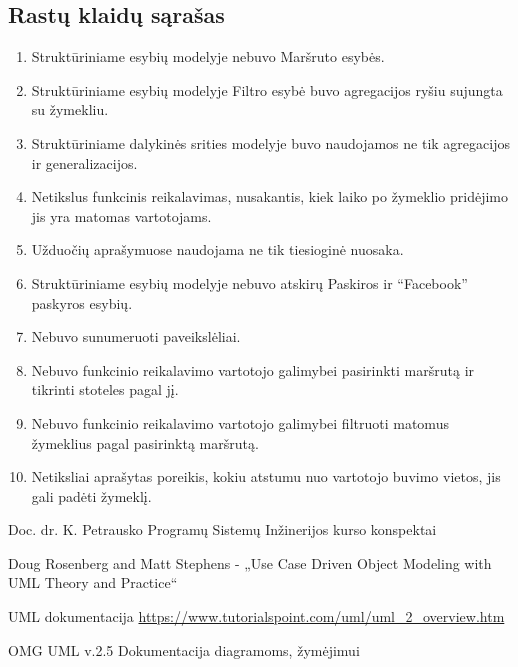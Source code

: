 \documentclass{VUMIFPSkursinis}
\begin{document}
\subsection{Rastų klaidų sąrašas}
	\begin{enumerate}[itemsep=-2mm]
		\item Struktūriniame esybių modelyje nebuvo Maršruto esybės.
		\item Struktūriniame esybių modelyje Filtro esybė buvo agregacijos ryšiu sujungta su žymekliu.
		\item Struktūriniame dalykinės srities modelyje buvo naudojamos ne tik agregacijos ir generalizacijos.
		\item Netikslus funkcinis reikalavimas, nusakantis, kiek laiko po žymeklio pridėjimo jis yra matomas vartotojams.
		\item Užduočių aprašymuose naudojama ne tik tiesioginė nuosaka.
		\item Struktūriniame esybių modelyje nebuvo atskirų Paskiros ir “Facebook” paskyros esybių.
		\item Nebuvo sunumeruoti paveikslėliai.
		\item Nebuvo funkcinio reikalavimo vartotojo galimybei pasirinkti maršrutą ir tikrinti stoteles pagal jį.
		\item Nebuvo funkcinio reikalavimo vartotojo galimybei filtruoti matomus žymeklius pagal pasirinktą maršrutą.
		\item Netiksliai aprašytas poreikis, kokiu atstumu nuo vartotojo buvimo vietos, jis gali padėti žymeklį.
	\end{enumerate}

\begin{enumerate}[label={[\arabic*]};itemsep=-2mm]
	\item Doc. dr. K. Petrausko Programų Sistemų Inžinerijos kurso konspektai
	\item Doug Rosenberg and Matt Stephens - „Use Case Driven Object Modeling with UML Theory and Practice“
	\item UML dokumentacija \url{https://www.tutorialspoint.com/uml/uml_2_overview.htm}
	\item OMG UML v.2.5 Dokumentacija diagramoms, žymėjimui
\end{enumerate}
\end{document}
